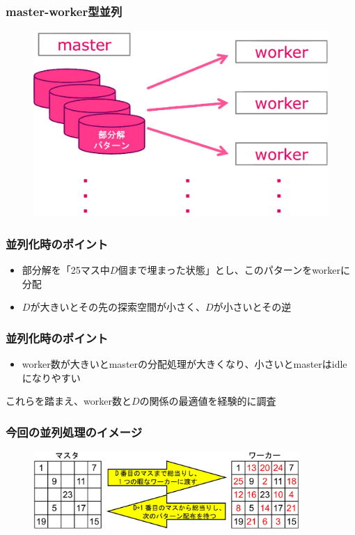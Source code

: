 \documentclass[dvipdfmx,20pt,notheorems,t]{beamer}
\begin{document}
\begin{frame}\frametitle{master-worker型並列}
\begin{figure}[htb]
\centering
\includegraphics[height=0.7\textheight]{real-master-worker.eps}
\end{figure}
\end{frame}

\begin{frame}\frametitle{並列化時のポイント}
\begin{itemize}
\item 部分解を「25マス中$D$個まで埋まった状態」とし、このパターンをworkerに分配
\item $D$が大きいとその先の探索空間が小さく、$D$が小さいとその逆
\end{itemize}
\end{frame}

\begin{frame}\frametitle{並列化時のポイント}
\begin{itemize}
\item worker数が大きいとmasterの分配処理が大きくなり、小さいとmasterはidleになりやすい
\end{itemize}
これらを踏まえ、worker数と$D$の関係の最適値を経験的に調査
\end{frame}

\begin{frame}\frametitle{今回の並列処理のイメージ}
\begin{figure}[htb]
\centering
\includegraphics[width=0.9\textwidth]{master-worker-proc.eps}
\end{figure}
\end{frame}
\end{document}
